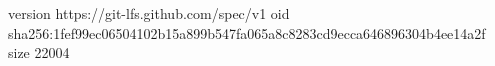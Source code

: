version https://git-lfs.github.com/spec/v1
oid sha256:1fef99ec06504102b15a899b547fa065a8c8283cd9ecca646896304b4ee14a2f
size 22004
